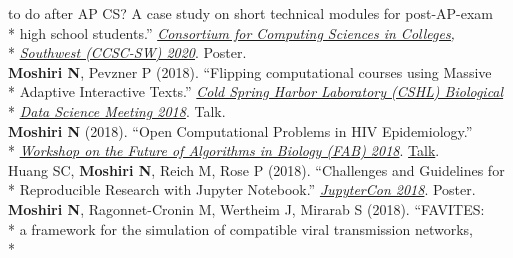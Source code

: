 \documentclass[margin,line]{res}
\begin{document}
\begin{resume}
\hspace*{9.5mm} to do after AP CS? A case study on short technical modules for post-AP-exam\\*
\hspace*{9.5mm} high school students.'' \href{http://ccsc.org/southwestern/2020/index.php}{\textit{Consortium for Computing Sciences in Colleges,}}\\*\vspace{2mm}
\hspace*{8mm} \href{http://ccsc.org/southwestern/2020/index.php}{\textit{Southwest (CCSC-SW) 2020}}. Poster.\\
\hspace*{4mm} \textbf{Moshiri N}, Pevzner P (2018). ``Flipping computational courses using Massive\\*
\hspace*{9.5mm} Adaptive Interactive Texts.'' \href{http://meetings.cshl.edu/meetings.aspx?meet=DATA&year=18}{\textit{Cold Spring Harbor Laboratory (CSHL) Biological}}\\*\vspace{2mm}
\hspace*{8mm} \href{http://meetings.cshl.edu/meetings.aspx?meet=DATA&year=18}{\textit{Data Science Meeting 2018}}. Talk.\\
\hspace*{4mm} \textbf{Moshiri N} (2018). ``Open Computational Problems in HIV Epidemiology.''\\*\vspace{2mm}
\hspace*{8mm} \href{http://fab2018.cbd.cmu.edu/}{\textit{Workshop on the Future of Algorithms in Biology (FAB) 2018}}. \href{https://youtu.be/ENKBbV_30kk}{Talk}.\\
\hspace*{4mm} Huang SC, \textbf{Moshiri N}, Reich M, Rose P (2018). ``Challenges and Guidelines for\\*\vspace{2mm}
\hspace*{8mm} Reproducible Research with Jupyter Notebook.'' \href{https://conferences.oreilly.com/jupyter/jup-ny}{\textit{JupyterCon 2018}}. Poster.\\
\hspace*{4mm} \textbf{Moshiri N}, Ragonnet-Cronin M, Wertheim J, Mirarab S (2018). ``FAVITES:\\*
\hspace*{9.5mm} a framework for the simulation of compatible viral transmission networks,\\*\vspace{2mm}

\end{resume}
\end{document}
